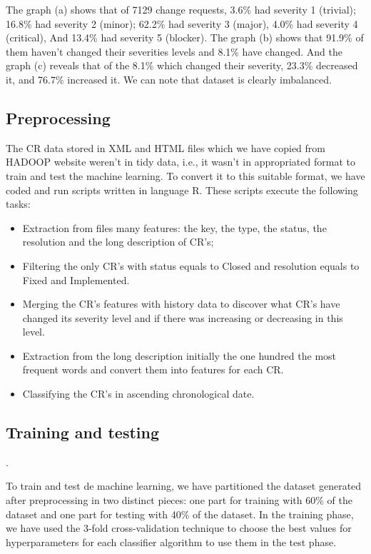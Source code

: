 \documentclass[10pt, conference]{IEEEtran}
\begin{document}
The graph (a) shows that of 7129 change requests, 3.6\% had severity 1 (trivial); 16.8\% had severity 2 (minor); 62.2\% had severity 3 (major), 4.0\% had severity 4 (critical), And 13.4\% had severity 5 (blocker). The graph (b) shows that 91.9\% of them haven't changed their severities levels and 8.1\% have changed. And the graph (c) reveals that of the 8.1\% which changed their severity, 23.3\% decreased it, and 76.7\% increased it. We can note that dataset is clearly imbalanced.


\subsection{Preprocessing}
The CR data stored in XML and HTML files which we have copied from HADOOP website weren't in tidy data\cite{DeJonge2013}, i.e., it wasn't in appropriated format to train and test the machine learning. To convert it to this suitable format, we have coded and run scripts written in language R. These scripts execute the following tasks:
\begin{itemize}
 \item Extraction from files many features: the key, the type, the status, the resolution and the long description of CR's;
 \item Filtering the only CR's with status equals to Closed and resolution equals to Fixed and Implemented. 
 \item Merging the CR's features with history data to discover what CR's have changed its severity level and if there was increasing or decreasing in this level.
 \item Extraction from the long description initially the one hundred the most frequent words and convert them into features for each CR.
 \item Classifying the CR's in ascending chronological date. 
\end{itemize}


\subsection{Training and testing}. 

To train and test de machine learning, we have partitioned the dataset generated after preprocessing in two distinct pieces: one part for training with 60\% of the dataset and one part for testing with 40\% of the dataset. In the training phase, we have used the 3-fold cross-validation technique to choose the best values for hyperparameters for each classifier algorithm to use them in the test phase. 
\end{document}
